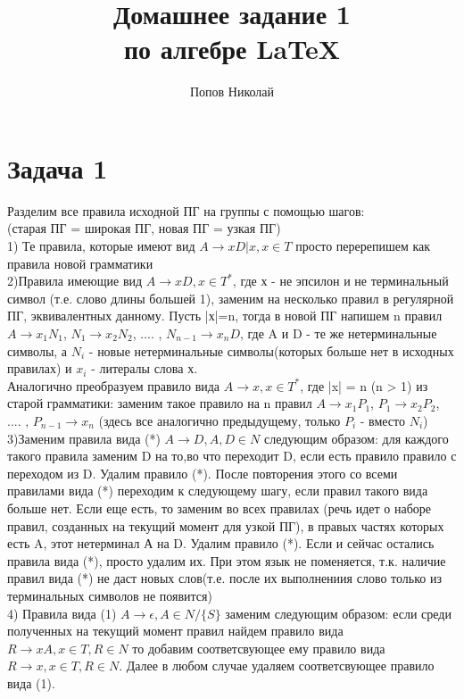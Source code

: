 \documentclass[a4paper,12pt]{article} %
\author{Попов Николай}
\title{Домашнее задание 1\\ по алгебре \LaTeX{}}
\begin{document}
 

\section*{Задача 1}
Разделим все правила исходной ПГ на группы с помощью шагов: \\
(старая ПГ = широкая ПГ, новая ПГ = узкая ПГ) \\

1) Те правила, которые имеют вид $A \rightarrow xD|x, x \in T$ просто перерепишем как правила новой грамматики\\

2)Правила имеющие вид $A \rightarrow xD, x \in T^*$, где х - не эпсилон и не терминальный символ (т.е. слово длины большей 1), заменим на несколько правил в  регулярной ПГ, эквивалентных данному. Пусть |х|=n, тогда в новой ПГ напишем n  правил $ A  \rightarrow x_1N_1 $, $ N_1 \rightarrow x_2N_2 $, .... , $ N_{n-1}  \rightarrow x_nD $, где A и D - те же нетерминальные символы, а $N_i$ - новые нетерминальные символы(которых больше нет в исходных правилах) и $x_i$ - литералы слова х.\\

Аналогично преобразуем правило вида $A \rightarrow x, x \in T^*$, где |x| = n (n > 1) из старой грамматики: заменим такое правило на n правил $ A  \rightarrow x_1P_1 $, $ P_1 \rightarrow x_2P_2 $, .... , $ P_{n-1}  \rightarrow x_n $ (здесь все аналогично предыдущему, только $P_i$ - вместо $N_i$)\\

3)Заменим правила вида (*) $A \rightarrow D, A,D \in N$ следующим образом: для каждого такого правила заменим D на то,во что переходит D, если есть правило правило с переходом из D. Удалим правило (*). После повторения этого со всеми правилами вида (*) переходим к следующему шагу, если правил такого вида больше нет. Если еще есть, то заменим во всех правилах (речь идет о наборе правил, созданных на текущий момент для узкой ПГ), в правых частях которых есть A, этот нетерминал А на D. Удалим правило (*). Если и сейчас остались правила вида (*), просто удалим их. При этом язык не поменяется, т.к. наличие правил вида (*) не даст новых слов(т.е. после их выполнениия слово только из терминальных символов не появится)\\

4) Правила вида (1) $A \rightarrow \epsilon, A \in N/\{S\}$ заменим следующим образом: если среди полученных на текущий момент правил найдем правило вида $ R\rightarrow xA, x \in T, R \in N$ то добавим соответсвующее ему правило вида $ R\rightarrow x, x \in T, R \in N$. Далее в любом случае удаляем соответсвующее правило вида (1).\\
\end{document}
